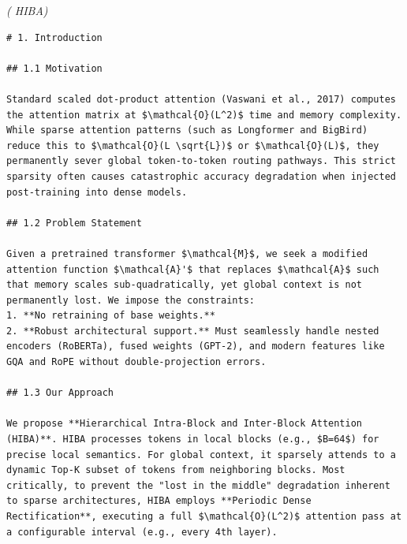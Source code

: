 \textit{(                                               HIBA)}

\begin{lstlisting}
# 1. Introduction

## 1.1 Motivation

Standard scaled dot-product attention (Vaswani et al., 2017) computes the attention matrix at $\mathcal{O}(L^2)$ time and memory complexity. While sparse attention patterns (such as Longformer and BigBird) reduce this to $\mathcal{O}(L \sqrt{L})$ or $\mathcal{O}(L)$, they permanently sever global token-to-token routing pathways. This strict sparsity often causes catastrophic accuracy degradation when injected post-training into dense models. 

## 1.2 Problem Statement

Given a pretrained transformer $\mathcal{M}$, we seek a modified attention function $\mathcal{A}'$ that replaces $\mathcal{A}$ such that memory scales sub-quadratically, yet global context is not permanently lost. We impose the constraints:
1. **No retraining of base weights.** 
2. **Robust architectural support.** Must seamlessly handle nested encoders (RoBERTa), fused weights (GPT-2), and modern features like GQA and RoPE without double-projection errors.

## 1.3 Our Approach

We propose **Hierarchical Intra-Block and Inter-Block Attention (HIBA)**. HIBA processes tokens in local blocks (e.g., $B=64$) for precise local semantics. For global context, it sparsely attends to a dynamic Top-K subset of tokens from neighboring blocks. Most critically, to prevent the "lost in the middle" degradation inherent to sparse architectures, HIBA employs **Periodic Dense Rectification**, executing a full $\mathcal{O}(L^2)$ attention pass at a configurable interval (e.g., every 4th layer). 

\end{lstlisting}

